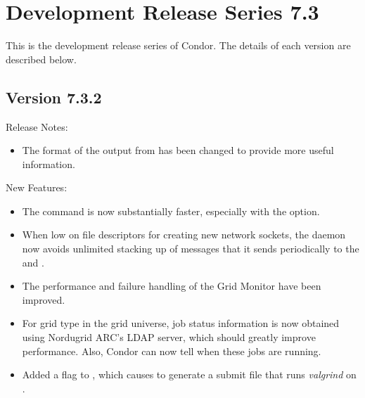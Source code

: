 
\section{\label{sec:History-7-3}Development Release Series 7.3}

This is the development release series of Condor.
The details of each version are described below.

\subsection*{\label{sec:New-7-3-2}Version 7.3.2}

\noindent Release Notes:

\begin{itemize}

\item The format of the output from   has been 
changed to provide more useful information.

\end{itemize}

\noindent New Features:

\begin{itemize}

\item The  command is now substantially faster, 
especially with the  option.

\item When low on file descriptors for creating new network sockets,
the  daemon now avoids unlimited stacking up of
messages that it sends periodically to the  
and .

\item The performance and failure handling of the Grid Monitor have been
improved.

\item For grid type  in the grid universe,
job status information
is now obtained using Nordugrid ARC's LDAP server, which should greatly
improve performance. Also, Condor can now tell when these jobs are running.

\item Added a  flag to , which
causes  to generate a submit file that runs
\emph{valgrind} on .

\end{itemize}

